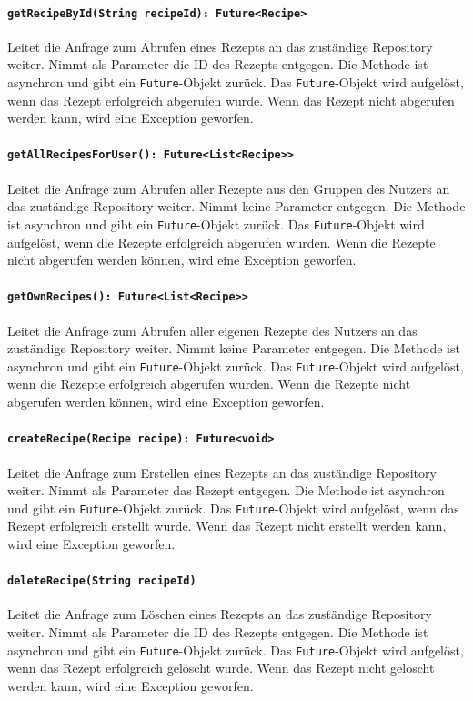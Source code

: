 \documentclass[parskip=full]{scrartcl}
\begin{document}
\paragraph{\texttt{getRecipeById(String recipeId): Future<Recipe>}}
Leitet die Anfrage zum Abrufen eines Rezepts an das zuständige Repository weiter. Nimmt als Parameter die ID des Rezepts entgegen. Die Methode ist asynchron und gibt ein \texttt{Future}-Objekt zurück. Das \texttt{Future}-Objekt wird aufgelöst, wenn das Rezept erfolgreich abgerufen wurde. Wenn das Rezept nicht abgerufen werden kann, wird eine Exception geworfen.
\paragraph{\texttt{getAllRecipesForUser(): Future<List<Recipe>>}}
Leitet die Anfrage zum Abrufen aller Rezepte aus den Gruppen des Nutzers an das zuständige Repository weiter. Nimmt keine Parameter entgegen. Die Methode ist asynchron und gibt ein \texttt{Future}-Objekt zurück. Das \texttt{Future}-Objekt wird aufgelöst, wenn die Rezepte erfolgreich abgerufen wurden. Wenn die Rezepte nicht abgerufen werden können, wird eine Exception geworfen.
\paragraph{\texttt{getOwnRecipes(): Future<List<Recipe>>}}
Leitet die Anfrage zum Abrufen aller eigenen Rezepte des Nutzers an das zuständige Repository weiter. Nimmt keine Parameter entgegen. Die Methode ist asynchron und gibt ein \texttt{Future}-Objekt zurück. Das \texttt{Future}-Objekt wird aufgelöst, wenn die Rezepte erfolgreich abgerufen wurden. Wenn die Rezepte nicht abgerufen werden können, wird eine Exception geworfen.
\paragraph{\texttt{createRecipe(Recipe recipe): Future<void>}}
Leitet die Anfrage zum Erstellen eines Rezepts an das zuständige Repository weiter. Nimmt als Parameter das Rezept entgegen. Die Methode ist asynchron und gibt ein \texttt{Future}-Objekt zurück. Das \texttt{Future}-Objekt wird aufgelöst, wenn das Rezept erfolgreich erstellt wurde. Wenn das Rezept nicht erstellt werden kann, wird eine Exception geworfen.
\paragraph{\texttt{deleteRecipe(String recipeId)}}
Leitet die Anfrage zum Löschen eines Rezepts an das zuständige Repository weiter. Nimmt als Parameter die ID des Rezepts entgegen. Die Methode ist asynchron und gibt ein \texttt{Future}-Objekt zurück. Das \texttt{Future}-Objekt wird aufgelöst, wenn das Rezept erfolgreich gelöscht wurde. Wenn das Rezept nicht gelöscht werden kann, wird eine Exception geworfen.
\end{document}
